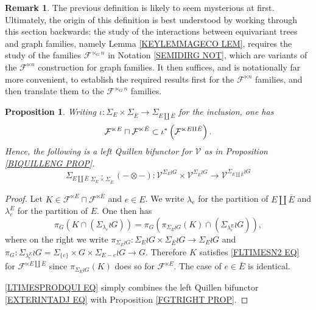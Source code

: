 \documentclass[a4paper,10pt
,draft
]{article}%
\numberwithin{equation}{section}
\numberwithin{figure}{section}
\newtheorem{proposition}[equation]{Proposition}%
\theoremstyle{definition} %
\newtheorem{remark}[equation]{Remark}%
\newcommand{\1}{\ensuremath{\mathbbm 1}}%
\begin{document}
\begin{remark}
The previous definition is likely to seem mysterious at first. Ultimately, the origin of this definition
is best understood by working through this section backwards:
the study of the interactions between equivariant trees and graph families, namely Lemma \ref{KEYLEMMAGECO LEM}, requires the study of the families $\mathcal{F}^{\ltimes_G n}$ in Notation \ref{SEMIDIRG NOT}, which are variants of the $\mathcal{F}^{\ltimes n}$ construction for graph families.
It then suffices, and is notationally far more convenient, to establish the required results first for the $\mathcal{F}^{\ltimes n}$ families,
and then translate them to the $\mathcal{F}^{\ltimes_G n}$ families.
\end{remark}


\begin{proposition}\label{LTIMESPRODINC PROP}
	Writing 
	$\iota \colon \Sigma_E \times \Sigma_{\bar{E}} \to
	\Sigma_{E \amalg \bar{E}}$ for the inclusion, one has 
\[
	\mathcal{F}^{\ltimes E}
		\sqcap
	\mathcal{F}^{\ltimes \bar{E}}
		\subset
	\iota^{\**}\left(\mathcal{F}^{\ltimes E \amalg \bar{E}}\right).
\]
	Hence, the following is a left Quillen bifunctor for $\mathcal V$ as in Proposition \ref{BIQUILLENG PROP}.
\begin{equation}\label{LTIMESPRODQUI EQ}
	\Sigma_{E \amalg \bar{E}} 
	\underset{\Sigma_E \times \Sigma_{\bar{E}}}{\cdot}
	(\minus \otimes \minus)
		\colon
	\mathcal{V}^{\Sigma_E \wr G}
		\times
	\mathcal{V}^{\Sigma_{\bar{E}} \wr G}
		\to
	\mathcal{V}^{\Sigma_{E \amalg \bar{E}} \wr G}
\end{equation}
\end{proposition}


\begin{proof}
	Let 
	$K \in 
	\mathcal{F}^{\ltimes E}
		\sqcap
	\mathcal{F}^{\ltimes \bar{E}}	
	$
	and $e \in E$. 
	We write $\lambda_e$ for the partition of $E \amalg \bar{E}$
	and $\lambda_e^E$ for the partition of $E$.
	One then has
\[
\pi_G
\left(
	K \cap \left( \Sigma_{\lambda_e} \wr G \right) \right)
	=
\pi_G
\left(
	\pi_{\Sigma_E \wr G}(K)
	\cap \left( \Sigma_{\lambda_e^E} \wr G \right)
\right),
\]
where on the right we write
$\pi_{\Sigma_E \wr G} \colon
\Sigma_E \wr G \times \Sigma_{\bar{E}} \wr G
\to 
\Sigma_E \wr G$
and 
$\pi_G \colon \Sigma_{\lambda^E_e} \wr G
=\Sigma_{\{e\}} \times G \times \Sigma_{E-e} \wr G
\to G$. Therefore $K$ 
satisfies \eqref{FLTIMESN2 EQ} for 
$\mathcal{F}^{\ltimes E \amalg \bar{E}}$
since 
$\pi_{\Sigma_E \wr G}(K)$ does so for 
$\mathcal{F}^{\ltimes E}$.
The case of $e \in \bar{E}$ is identical.

\eqref{LTIMESPRODQUI EQ} simply combines 
the left Quillen bifunctor
\eqref{EXTERINTADJ EQ} with 
Proposition \ref{FGTRIGHT PROP}.
\end{proof}
\end{document}
